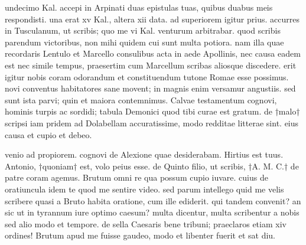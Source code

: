 


 undecimo Kal. accepi in Arpinati duas epistulas tuas, quibus duabus meis respondisti. una erat xv Kal., altera xii data. ad superiorem igitur prius. accurres in Tusculanum, ut scribis; quo me vi Kal. venturum arbitrabar. quod scribis parendum victoribus, non mihi quidem cui sunt multa potiora. nam illa quae recordaris Lentulo et Marcello consulibus acta in aede Apollinis, nec causa eadem est nec simile tempus, praesertim cum Marcellum scribas aliosque discedere. erit igitur nobis coram odorandum et constituendum tutone Romae esse possimus. novi conventus habitatores sane movent; in magnis enim versamur angustiis. sed sunt ista parvi; quin et maiora contemnimus. Calvae testamentum cognovi, hominis turpis ac sordidi; tabula Demonici quod tibi curae est gratum. de †malo† scripsi iam pridem ad Dolabellam accuratissime, modo redditae litterae sint. eius causa et cupio et debeo.

 venio ad propiorem. cognovi de Alexione quae desiderabam. Hirtius est tuus. Antonio, †quoniam† est, volo peius esse. de Quinto filio, ut scribis, †A. M. C.† de patre coram agemus. Brutum omni re qua possum cupio iuvare. cuius de oratiuncula idem te quod me sentire video. sed parum intellego quid me velis scribere quasi a Bruto habita oratione, cum ille ediderit. qui tandem convenit? an sic ut in tyrannum iure optimo caesum? multa dicentur, multa scribentur a nobis sed alio modo et tempore. de sella Caesaris bene tribuni; praeclaros etiam xiv ordines! Brutum apud me fuisse gaudeo, modo et libenter fuerit et sat diu.
